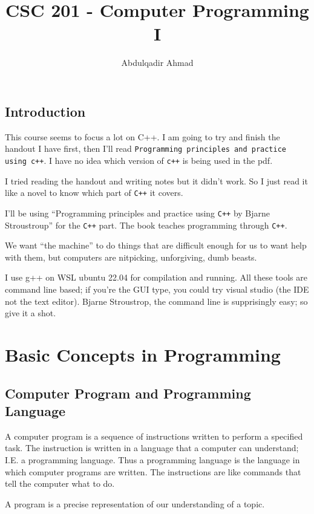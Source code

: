 \documentclass{book}
\title{CSC 201 {-} Computer Programming I}
\author{Abdulqadir Ahmad}
\begin{document}
\maketitle
\tableofcontents

\section{Introduction}
This course seems to focus a lot on C++. I am going to try and finish the handout I have first, then I'll read \verb|Programming principles and practice using c++|. I have no idea which version of \verb|c++| is being used in the pdf.

I tried reading the handout and writing notes but it didn't work. So I just read it like a novel to know which part of \verb|C++| it covers.

I'll be using ``Programming principles and practice using \verb|C++| by Bjarne Stroustroup'' for the \verb|C++| part. The book teaches programming through \verb|C++|.

\begin{itshape}
	We want “the machine” to do things that are difficult enough for us to want help with them, but computers are nitpicking, unforgiving, dumb beasts.
\end{itshape}

I use g++ on WSL ubuntu 22.04 for compilation and running. All these tools are command line based; if you're the GUI type, you could try visual studio (the IDE not the text editor). Bjarne Stroustrop, the command line is supprisingly easy; so give it a shot.

\chapter{Basic Concepts in Programming}

\section{Computer Program and Programming Language}
A computer program is a sequence of instructions written to perform a specified task. The instruction is written in a language that a computer can understand; I.E. a programming language. Thus a programming language is the language in which computer programs are written. The instructions are like commands that tell the computer what to do.

A program is a precise representation of our understanding of a topic.
\end{document}
